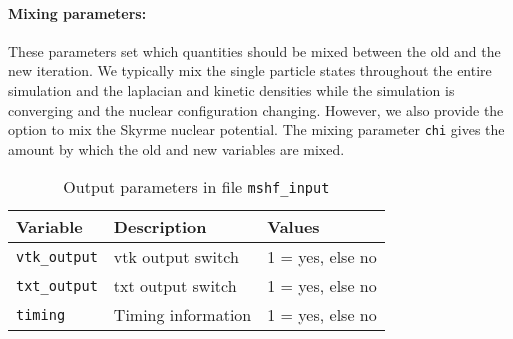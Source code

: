 \documentclass[3p]{elsarticle}
\begin{document}
\paragraph{Mixing parameters: } These parameters set which quantities should be mixed between the old and the new iteration. We typically mix the single particle states throughout the entire simulation and the laplacian and kinetic densities while the simulation is converging and the nuclear configuration changing. However, we also provide the option to mix the Skyrme nuclear potential. The mixing parameter {\tt chi} gives the amount by which the old and new variables are mixed. 
\begin{table}
\caption{Output parameters in file \texttt{mshf\_input}}
\begin{tabular*}{\columnwidth}{ l l l}
\hline
\hline
Variable & Description & Values\\
\hline
\texttt{vtk\_output}       & vtk output switch                               & 1 = yes, else no\\
\texttt{txt\_output}        & txt output switch                               & 1 = yes, else no\\
\texttt{timing}               & Timing information                           & 1 = yes, else no\\
\hline
\hline
\end{tabular*}
\label{table4}
\end{table}
\end{document}
